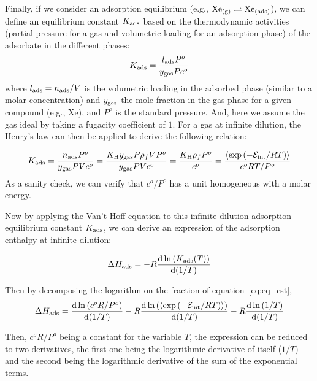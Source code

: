 \documentclass[main.tex]{subfiles}
\begin{document}
Finally, if we consider an adsorption equilibrium (e.g., $\text{Xe}_{\text{(g)}} \rightleftharpoons \text{Xe}_{\text{(ads)}}$), we can define an equilibrium constant $K_{\text{ads}}$ based on the thermodynamic activities (partial pressure for a gas and volumetric loading for an adsorption phase) of the adsorbate in the different phases:
\begin{equation}
  K_{\text{ads}} = \dfrac{l_{\text{ads}}P^o}{y_{\text{gas}}Pc^o}
\end{equation}
where $l_{\text{ads}}=n_{\text{ads}}/V$ is the volumetric loading in the adsorbed phase (similar to a molar concentration) and $y_{\text{gas}}$ the mole fraction in the gas phase for a given compound (e.g., Xe), and $P^o$ is the standard pressure. And, here we assume the gas ideal by taking a fugacity coefficient of $1$. For a gas at infinite dilution, the Henry's law can then be applied to derive the following relation:

\begin{equation}\label{eq:eq_cst}
  K_{\text{ads}} = \dfrac{n_{\text{ads}}P^o}{y_{\text{gas}}PVc^o} = \dfrac{K_{\text{H}}y_{\text{gas}}P\rho_f V P^o}{y_{\text{gas}}PVc^o} = \dfrac{K_{\text{H}}\rho_f P^o}{c^o} = \dfrac{\langle \exp\left(-\mathcal{E}_{\text{int}}/RT\right) \rangle}{c^o RT/P^o}
\end{equation}
As a sanity check, we can verify that $c^o/P^o$ has a unit homogeneous with a molar energy.

Now by applying the Van't Hoff equation to this infinite-dilution adsorption equilibrium constant $K_{\text{ads}}$, we can derive an expression of the adsorption enthalpy at infinite dilution:

\begin{equation}
  \Delta H_{\text{ads}} = -R\dfrac{\mathop{}\mathopen{}\mathrm{d} \ln\left(K_{\text{ads}}(T)\right)}{\mathop{}\mathopen{}\mathrm{d} (1/T)}
\end{equation}

Then by decomposing the logarithm on the fraction of equation~\ref{eq:eq_cst}, 
\begin{equation}
  \Delta H_{\text{ads}} = \dfrac{\mathop{}\mathopen{}\mathrm{d} \ln\left(c^o R/P^o\right)}{\mathop{}\mathopen{}\mathrm{d} (1/T)} - R\dfrac{\mathop{}\mathopen{}\mathrm{d} \ln\left(\langle \exp\left(-\mathcal{E}_{\text{int}}/RT\right) \rangle\right)}{\mathop{}\mathopen{}\mathrm{d} (1/T)} - R\dfrac{\mathop{}\mathopen{}\mathrm{d} \ln\left(1/T\right)}{\mathop{}\mathopen{}\mathrm{d} (1/T)}
\end{equation}

Then, $c^o R/P^o$ being a constant for the variable $T$, the expression can be reduced to two derivatives, the first one being the logarithmic derivative of itself ($1/T$) and the second being the logarithmic derivative of the sum of the exponential terms. 
\end{document}

